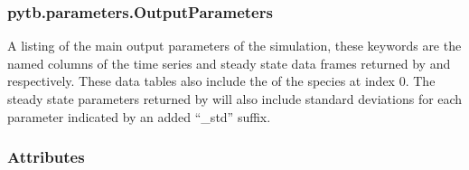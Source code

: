 \documentclass[letterpaper,10pt,english,openany,oneside]{sphinxmanual}
\begin{document}
\sphinxstepscope


\subsubsection{pytb.parameters.OutputParameters}
\label{\detokenize{api/pytb.parameters.OutputParameters:pytb-parameters-outputparameters}}\label{\detokenize{api/pytb.parameters.OutputParameters::doc}}

\begin{fulllineitems}
\label{\detokenize{api/pytb.parameters.OutputParameters:pytb.parameters.OutputParameters}}
\pysigstartsignatures
{}
\pysigstopsignatures
\sphinxAtStartPar
A listing of the main output parameters of the simulation, these keywords
are the named columns of the time series and steady state data frames
returned by {\hyperref[\detokenize{api/pytb.ThunderBoltz.get_timeseries:pytb.ThunderBoltz.get_timeseries}]{}} and
{\hyperref[\detokenize{api/pytb.ThunderBoltz.get_ss_params:pytb.ThunderBoltz.get_ss_params}]{}} respectively. These data tables also
include the {\hyperref[\detokenize{api/pytb.parameters.ParticleParameters:pytb.parameters.ParticleParameters}]{}} of the species at index \(0\).
The steady state parameters returned by {\hyperref[\detokenize{api/pytb.ThunderBoltz.get_ss_params:pytb.ThunderBoltz.get_ss_params}]{}}
will also include standard deviations for each parameter indicated by an
added “\_std” suffix.
\subsubsection*{Attributes}



\end{fulllineitems}
\end{document}
